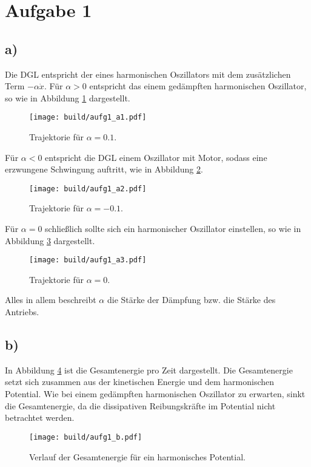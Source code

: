 \section*{Aufgabe 1}
\subsection*{a)}
Die DGL entspricht der eines harmonischen Oszillators mit dem zusätzlichen
Term $- \alpha \dot{x}$. Für $\alpha > 0$ entspricht das einem gedämpften
harmonischen Oszillator, so wie in Abbildung \ref{fig:gedämpft} dargestellt.

\begin{figure}
  \centering
  \texttt{[image: build/aufg1\_a1.pdf]}
  \caption{Trajektorie für $\alpha = 0.1$.}
  \label{fig:gedämpft}
\end{figure}

Für $\alpha < 0$ entspricht die DGL einem Oszillator mit Motor, sodass eine
erzwungene Schwingung auftritt, wie in Abbildung \ref{fig:erzwungen}.

\begin{figure}
  \centering
  \texttt{[image: build/aufg1\_a2.pdf]}
  \caption{Trajektorie für $\alpha = -0.1$.}
  \label{fig:erzwungen}
\end{figure}

Für $\alpha = 0$ schließlich sollte sich ein harmonischer Oszillator einstellen,
so wie in Abbildung \ref{fig:harmonisch} dargestellt.

\begin{figure}
  \centering
  \texttt{[image: build/aufg1\_a3.pdf]}
  \caption{Trajektorie für $\alpha = 0$.}
  \label{fig:harmonisch}
\end{figure}

Alles in allem beschreibt $\alpha$ die Stärke der Dämpfung bzw. die Stärke des
Antriebs.

\subsection*{b)}
In Abbildung \ref{fig:energie} ist die Gesamtenergie pro Zeit dargestellt.
Die Gesamtenergie setzt sich zusammen aus der kinetischen Energie und dem harmonischen
Potential. Wie bei einem gedämpften harmonischen Oszillator zu erwarten, sinkt die Gesamtenergie,
da die dissipativen Reibungskräfte im Potential nicht betrachtet werden.

\begin{figure}
  \centering
  \texttt{[image: build/aufg1\_b.pdf]}
  \caption{Verlauf der Gesamtenergie für ein harmonisches Potential.}
  \label{fig:energie}
\end{figure}


